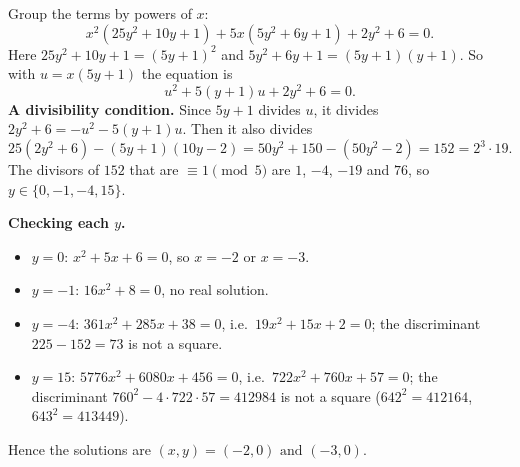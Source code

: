 Group the terms by powers of $x$:
\[
x^2\left(25y^2+10y+1\right)+5x\left(5y^2+6y+1\right)+2y^2+6=0 .
\]
Here $25y^2+10y+1=(5y+1)^2$ and $5y^2+6y+1=(5y+1)(y+1)$. So with $u=x(5y+1)$ the equation is
\[
u^2+5(y+1)u+2y^2+6=0 .
\]
\textbf{A divisibility condition.} Since $5y+1$ divides $u$, it divides $2y^2+6=-u^2-5(y+1)u$. Then it also divides
\[
25\left(2y^2+6\right)-(5y+1)(10y-2)=50y^2+150-\left(50y^2-2\right)=152=2^3\cdot19 .
\]
The divisors of $152$ that are $\equiv1\pmod5$ are $1$, $-4$, $-19$ and $76$, so $y\in\{0,-1,-4,15\}$.

\textbf{Checking each $y$.}
\begin{itemize}
\item $y=0$: $x^2+5x+6=0$, so $x=-2$ or $x=-3$.
\item $y=-1$: $16x^2+8=0$, no real solution.
\item $y=-4$: $361x^2+285x+38=0$, i.e.\ $19x^2+15x+2=0$; the discriminant $225-152=73$ is not a square.
\item $y=15$: $5776x^2+6080x+456=0$, i.e.\ $722x^2+760x+57=0$; the discriminant $760^2-4\cdot722\cdot57=412984$ is not a square ($642^2=412164$, $643^2=413449$).
\end{itemize}
Hence the solutions are $\boxed{(x,y)=(-2,0)\text{ and }(-3,0)}$.
